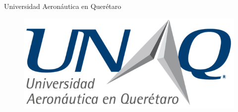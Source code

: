 \begin{titlepage}
	\begin{center}
		{\Huge Universidad Aeronáutica en Querétaro}
		\vspace{1cm}
		\begin{figure}[h]
			\centering
			\includegraphics[scale=0.6]{Portada/UNAQ_logo.png}			
		\end{figure}
	\end{center}

\end{titlepage}
